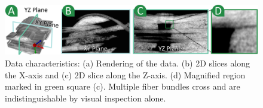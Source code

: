 

\begin{figure}[tb]
\centering
\includegraphics[width=\linewidth]{images_pvis/data-char.pdf}
\caption{Data characteristics: (a) Rendering of the data. (b) 2D slices along the X-axis and (c) 2D slice along the Z-axis. (d) Magnified region marked in green square (c). Multiple fiber bundles cross and are indistinguishable by visual inspection alone. }
\label{fig:data-char}
\end{figure}
